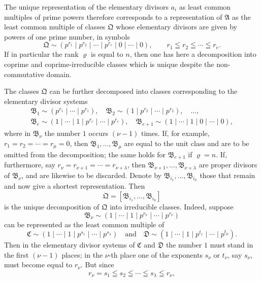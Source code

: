 \documentclass[11pt]{article}
\begin{document}
The unique representation of the elementary divisors $a_i$ as least common multiples of prime powers therefore corresponds to a representation of $\mathfrak A$ as the least common multiple of classes $\mathfrak Q$ whose elementary divisors are given by powers of one prime number, in symbols
\[
 \mathfrak Q\sim(p^{r_1}\mid p^{r_2}\mid\cdots\mid p^{r_e}\mid0\mid\cdots\mid0),
 \qquad r_1\leqq r_2\leqq\cdots\leqq r_e.
\]
If in particular the rank $\varrho$ is equal to $n$, then one has here a decomposition into coprime and coprime-irreducible classes which is unique despite the non-commutative domain.

The classes $\mathfrak Q$ can be further decomposed into classes corresponding to the elementary divisor systems
\[
\begin{gathered}
 \mathfrak B_1\sim(p^{r_1}\mid\cdots\mid p^{r_1}),\quad
 \mathfrak B_2\sim(1\mid p^{r_2}\mid\cdots\mid p^{r_2}),\quad \ldots,\\
 \mathfrak B_e\sim(1\mid\cdots\mid1\mid p^{r_e}\mid\cdots\mid p^{r_e}),\quad
 \mathfrak B_{e+1}\sim(1\mid\cdots\mid1\mid0\mid\cdots\mid0),
\end{gathered}
\]
where in $\mathfrak B_\nu$ the number $1$ occurs $(\nu-1)$ times. If, for example, $r_1=r_2=\cdots=r_\mu=0$, then $\mathfrak B_1,
\ldots,\mathfrak B_\mu$ are equal to the unit class and are to be omitted from the decomposition; the same holds for $\mathfrak B_{e+1}$ if $\varrho=n$. If, furthermore, say $r_\nu=r_{\nu+1}=\cdots=r_{\nu+\lambda}$, then $\mathfrak B_{\nu+1},
\ldots,\mathfrak B_{\nu+\lambda}$ are proper divisors of $\mathfrak B_\nu$, and are likewise to be discarded. Denote by $\mathfrak B_{i_1},
\ldots,\mathfrak B_{i_k}$ those that remain and now give a shortest representation. Then
\[
 \mathfrak Q=[\mathfrak B_{i_1},
\ldots,\mathfrak B_{i_k}]
\]
is the unique decomposition of $\mathfrak Q$ into irreducible classes. Indeed, suppose
\[
 \mathfrak B_\nu\sim(1\mid\cdots\mid1\mid p^{r_\nu}\mid\cdots\mid p^{r_\nu})
\]
can be represented as the least common multiple of
\[
 \mathfrak C\sim(1\mid\cdots\mid1\mid p^{s_1}\mid\cdots\mid p^{s_\lambda})
 \quad\text{and}\quad
 \mathfrak D\sim(1\mid\cdots\mid1\mid p^{t_1}\mid\cdots\mid p^{t_\mu}).
\]
Then in the elementary divisor systems of $\mathfrak C$ and $\mathfrak D$ the number $1$ must stand in the first $(\nu-1)$ places; in the $\nu$-th place one of the exponents $s_\nu$ or $t_\nu$, say $s_\nu$, must become equal to $r_\nu$. But since
\[
 r_\nu=s_1\leqq s_2\leqq\cdots\leqq s_\lambda\leqq r_\nu,
\]
\end{document}
